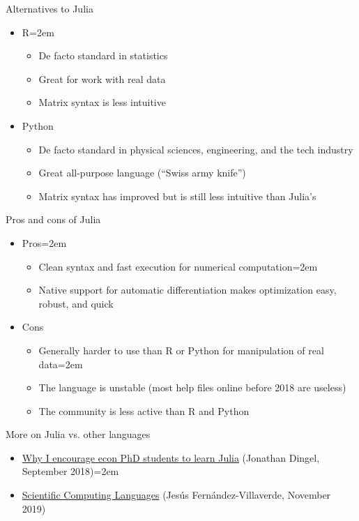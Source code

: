 \documentclass{beamer}
\begin{document}
\begin{frame}{Alternatives to Julia}
\begin{itemize}
    \item R\itemsep=2em
    \begin{itemize}
        \item De facto standard in statistics
        \item Great for work with real data
        \item Matrix syntax is less intuitive
    \end{itemize}
    \item<2-> Python
    \begin{itemize}
        \item De facto standard in physical sciences, engineering, and the tech industry
        \item Great all-purpose language (``Swiss army knife'')
        \item Matrix syntax has improved but is still less intuitive than Julia's
    \end{itemize}
\end{itemize}
\end{frame}

\begin{frame}{Pros and cons of Julia}
\begin{itemize}
    \item Pros\itemsep=2em
    \begin{itemize}
        \item Clean syntax and fast execution for numerical computation\itemsep=2em
        \item Native support for automatic differentiation makes optimization easy, robust, and quick
    \end{itemize}
    \item<2-> Cons
    \begin{itemize}
        \item Generally harder to use than R or Python for manipulation of real data\itemsep=2em
        \item The language is unstable (most help files online before 2018 are useless)
        \item The community is less active than R and Python
    \end{itemize}
\end{itemize}
\end{frame}

\begin{frame}{More on Julia vs. other languages}
\begin{itemize}
    \item \href{https://tradediversion.net/2018/09/17/why-i-encourage-econ-phd-students-to-learn-julia/}{Why I encourage econ PhD students to learn Julia} (Jonathan Dingel, September 2018)\itemsep=2em
    \item \href{https://www.sas.upenn.edu/~jesusfv/Lecture_HPC_5_Scientific_Computing_Languages.pdf}{Scientific Computing Languages} (Jesús Fernández-Villaverde, November 2019)
\end{itemize}
\end{frame}
\end{document}
